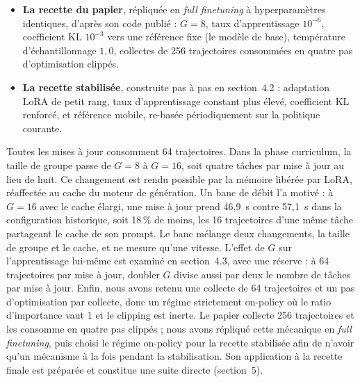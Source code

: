 \documentclass[11pt,a4paper]{article}
\begin{document}
\begin{itemize}
    \item \textbf{La recette du papier}, répliquée en \emph{full finetuning} à hyperparamètres identiques, d'après son code publié : $G=8$, taux d'apprentissage $10^{-6}$, coefficient KL $10^{-3}$ vers une référence fixe (le modèle de base), température d'échantillonnage $1{,}0$, collectes de 256 trajectoires consommées en quatre pas d'optimisation clippés.
    \item \textbf{La recette stabilisée}, construite pas à pas en section~4.2 : adaptation LoRA de petit rang, taux d'apprentissage constant plus élevé, coefficient KL renforcé, et référence mobile, re-basée périodiquement sur la politique courante.
\end{itemize}

Toutes les mises à jour consomment 64 trajectoires. Dans la phase curriculum, la taille de groupe passe de $G=8$ à $G=16$, soit quatre tâches par mise à jour au lieu de huit. Ce changement est rendu possible par la mémoire libérée par LoRA, réaffectée au cache du moteur de génération. Un banc de débit l'a motivé : à $G=16$ avec le cache élargi, une mise à jour prend 46{,}9~s contre 57{,}1~s dans la configuration historique, soit 18\,\% de moins, les 16 trajectoires d'une même tâche partageant le cache de son prompt. Le banc mélange deux changements, la taille de groupe et le cache, et ne mesure qu'une vitesse. L'effet de $G$ sur l'apprentissage lui-même est examiné en section~4.3, avec une réserve : à 64 trajectoires par mise à jour, doubler $G$ divise aussi par deux le nombre de tâches par mise à jour. Enfin, nous avons retenu une collecte de 64 trajectoires et un pas d'optimisation par collecte, donc un régime strictement on-policy où le ratio d'importance vaut 1 et le clipping est inerte. Le papier collecte 256 trajectoires et les consomme en quatre pas clippés ; nous avons répliqué cette mécanique en \emph{full finetuning}, puis choisi le régime on-policy pour la recette stabilisée afin de n'avoir qu'un mécanisme à la fois pendant la stabilisation. Son application à la recette finale est préparée et constitue une suite directe (section~5).
\end{document}
